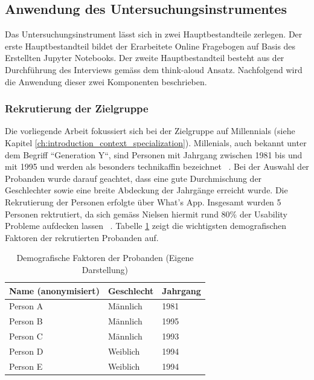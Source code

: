 \subsection{Anwendung des Untersuchungsinstrumentes}
Das Untersuchungsinstrument lässt sich in zwei Hauptbestandteile zerlegen. Der erste Hauptbestandteil bildet der Erarbeitete Online Fragebogen auf Basis des Erstellten Jupyter Notebooks. Der zweite Hauptbestandteil besteht aus der Durchführung des Interviews gemäss dem think-aloud Ansatz. Nachfolgend wird die Anwendung dieser zwei Komponenten beschrieben. 

\subsubsection{Rekrutierung der Zielgruppe}
Die vorliegende Arbeit fokussiert sich bei der Zielgruppe auf Millennials (siehe Kapitel \ref{ch:introduction_context_specialization}). Millenials, auch bekannt unter dem Begriff ``Generation Y``, sind Personen mit Jahrgang zwischen 1981 bis und mit 1995 und werden als besonders technikaffin bezeichnet ~\citep{term_millennials}. Bei der Auswahl der Probanden wurde darauf geachtet, dass eine gute Durchmischung der Geschlechter sowie eine breite Abdeckung der Jahrgänge erreicht wurde. Die Rekrutierung der Personen erfolgte über What's App. Insgesamt wurden 5 Personen rektrutiert, da sich gemäss Nielsen hiermit rund 80\% der Usability Probleme aufdecken lassen ~\citep{nielsen_number_of_participants_usability_testing}. Tabelle \ref{table:recruted_probands} zeigt die wichtigsten demografischen Faktoren der rekrutierten Probanden auf.

\begin{table}[h]
\centering
\begin{tabular}{@{}lll@{}}
\toprule
\textbf{Name (anonymisiert)} & \textbf{Geschlecht} & \textbf{Jahrgang} \\ \midrule
Person A & Männlich & 1981 \\ \midrule
Person B & Männlich & 1995 \\ \midrule
Person C & Männlich & 1993 \\ \midrule
Person D & Weiblich & 1994 \\ \midrule
Person E & Weiblich & 1994 \\ \bottomrule
\end{tabular}
\caption{Demografische Faktoren der Probanden (Eigene Darstellung)}
\label{table:recruted_probands}
\end{table}

